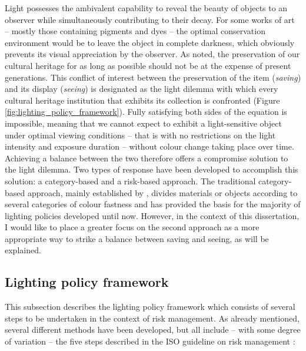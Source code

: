 Light possesses the ambivalent capability to reveal the beauty of objects to an observer while simultaneously contributing to their decay. For some works of art – mostly those containing pigments and dyes – the optimal conservation environment would be to leave the object in complete darkness, which obviously prevents its visual appreciation by the observer. As \citet{henderson_beyond_2020} noted, the preservation of our cultural heritage for as long as possible should not be at the expense of present generations. This conflict of interest between the preservation of the item (\textit{saving}) and its display (\textit{seeing}) is designated as the light dilemma with which every cultural heritage institution that exhibits its collection is confronted (Figure \ref{fig:lighting_policy_framework}). Fully satisfying both sides of the equation is impossible, meaning that we cannot expect to exhibit a light-sensitive object under optimal viewing conditions – that is with no restrictions on the light intensity and exposure duration – without colour change taking place over time. Achieving a balance between the two therefore offers a compromise solution to the light dilemma. Two types of response have been developed to accomplish this solution: a category-based and a risk-based approach. The traditional category-based approach, mainly established by \citet{thomson_museum_1990}, divides materials or objects according to several categories of colour fastness and has provided the basis for the majority of lighting policies developed until now. However, in the context of this dissertation, I would like to place a greater focus on the second approach as a more appropriate way to strike a balance between saving and seeing, as will be explained. 


\subsection{Lighting policy framework}
\label{sec:lighting policy framework}

This subsection describes the lighting policy framework which consists of several steps to be undertaken in the context of risk management. As already mentioned, several different methods have been developed, but all include – with some degree of variation – the five steps described in the ISO guideline on risk management \citep{international_organization_for_standardization_isotc_262_iso_2018}:


